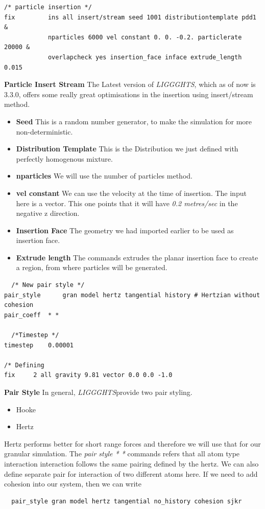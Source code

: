 \documentclass{tufte-book} %
\newcommand{\Li}{\textit{LIGGGHTS}}
\begin{document}
\begin{verbatim}
/* particle insertion */
fix         ins all insert/stream seed 1001 distributiontemplate pdd1 &
            nparticles 6000 vel constant 0. 0. -0.2. particlerate 20000 &
            overlapcheck yes insertion_face inface extrude_length 0.015                
\end{verbatim}
\textbf{Particle Insert Stream} The Latest version of \Li, which as of now is 3.3.0, offers some really great optimisations in the insertion using insert/stream method.
\begin{itemize}
\item \textbf{Seed} This is a random number generator, to make the simulation for more non-deterministic.
\item \textbf{Distribution Template} This is the Distribution we just defined with perfectly homogenous mixture.
\item \textbf{nparticles} We will use the number of particles method. 
\item \textbf{vel constant} We can use the velocity at the time of insertion. The input here is a vector. This one points that it will have \textit{0.2 metres/sec} in the negative z direction. 
\item \textbf{Insertion Face} The geometry we had imported earlier to be used as insertion face. 
\item \textbf{Extrude length} The commands extrudes the planar insertion face to create a region, from where particles will be generated. 
\end{itemize}

\begin{verbatim}
  /* New pair style */
pair_style      gran model hertz tangential history # Hertzian without cohesion
pair_coeff	* *

  /*Timestep */
timestep	0.00001

/* Defining 
fix		2 all gravity 9.81 vector 0.0 0.0 -1.0

\end{verbatim}

\textbf{Pair Style}
In general, \Li provide two pair styling.
\begin{itemize}
\item Hooke
\item Hertz
\end{itemize}
Hertz performs better for short range forces and therefore we will use that for our granular simulation. 
The \textit{pair style * *} commands refers that all atom type interaction interaction follows the same pairing defined by the hertz. We can also define separate pair for interaction of two different atoms here. If we need to add cohesion into our system, then we can write
\begin{verbatim}
  pair_style gran model hertz tangential no_history cohesion sjkr 
\end{verbatim}
\end{document}
